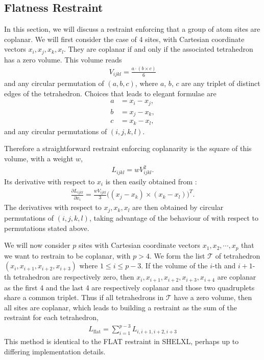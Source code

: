 \documentclass[pdf]{iucr}
\DeclareMathOperator{\dotprod}{\cdot}
\DeclareMathOperator{\crossprod}{\times}
\newcommand{\partialder}[2]{\frac{\partial #1}{\partial #2}}
\begin{document}
\subsection{Flatness Restraint}

In this section, we will discuss a restraint enforcing that a group of atom sites are coplanar. We will first consider the case of 4 sites, with Cartesian coordinate vectors $x_i, x_j, x_k, x_l$. They are coplanar if and only if the associated tetrahedron has a zero volume. This volume reads
\begin{align}
V_{ijkl} = \frac{a \dotprod (b \crossprod c)}{6}
\label{eqn:tetrahedron:volume}
\end{align}
and any circular permutation of $(a, b, c)$, where $a$, $b$, $c$ are any triplet of distinct edges of the tetrahedron. Choices that leads to elegant formulae are
\begin{align}
a &= x_i - x_j,\nonumber\\ 
b &= x_j - x_k,\label{eqn:tetrahedron:edges:choice1}\\ 
c &= x_k - x_l,\nonumber
\end{align}
and any circular permutations of $(i,j,k,l)$. 

Therefore a straightforward restraint enforcing coplanarity is the square of this volume, with a weight $w$,
\begin{align}
L_{ijkl} = w V_{ijkl}^2.
\end{align}
Its derivative with respect to $x_i$ is then easily obtained from :
\begin{align}
\partialder{L_{ijkl}}{x_i} = \frac{wV_{ijkl}}{3}\big((x_j - x_k) \crossprod (x_k - x_l)\big)^T.
\end{align}
The derivatives with respect to $x_j, x_k, x_l$ are then obtained by circular permutations of $(i,j,k,l)$, taking advantage of the behaviour of  with respect to permutations stated above.

We will now consider $p$ sites with Cartesian coordinate vectors $x_1, x_2, \cdots, x_p$ that we want to restrain to be coplanar, with $p>4$. We form the list $\mathcal{T}$ of tetrahedron $(x_i, x_{i+1}, x_{i+2}, x_{i+3})$ where $1 \le i \le p-3$. If the volume of the $i$-th and $i+1$-th tetrahedron are respectively zero, then $x_i, x_{i+1}, x_{i+2}, x_{i+3}, x_{i+4}$ are coplanar as the first 4 and the last 4 are respectively coplanar and those two quadruplets share a common triplet. Thus if all tetrahedrons in $\mathcal{T}$ have a zero volume, then all sites are coplanar, which leads to building a restraint as the sum of the restraint for each tetrahedron,
\begin{align}
L_\text{flat} = \sum_{i=1}^{p-3} L_{i,i+1,i+2,i+3}
\label{eqn:restraint:flatness:many}
\end{align}
This method is identical to the FLAT restraint in SHELXL, perhaps up to differing implementation details. 
\end{document}
